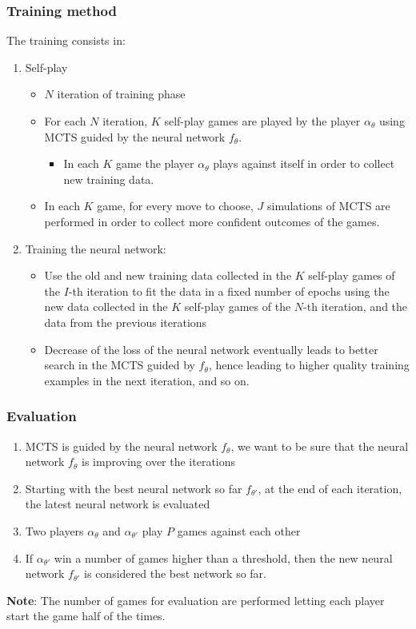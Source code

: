 \documentclass[9pt]{beamer}
\begin{document}
\begin{frame}
	\frametitle{Training method}

	The training consists in:
	\begin{enumerate}
		\item Self-play
		\begin{itemize}
			\item $N$ iteration of training phase
			\item For each $N$ iteration, $K$ self-play games are played by the player $\alpha_\theta$ using MCTS guided by the neural network $f_\theta$.
			\begin{itemize}
				\item In each $K$ game the player $\alpha_\theta$ plays against itself in order to collect new training data.
			\end{itemize}
			\item In each $K$ game, for every move to choose, $J$ simulations of MCTS are performed in order to collect more confident outcomes of the games.
		\end{itemize}
		
		\item Training the neural network:
		\begin{itemize}
			\item Use the old and new training data collected in the $K$ self-play games of the $I$-th iteration to fit the data in a fixed number of epochs using the new data collected in the $K$ self-play games of the $N$-th iteration, and the data from the previous iterations
			\item Decrease of the loss of the neural network eventually leads to better search in the MCTS guided by $f_\theta$, hence leading to higher quality training examples in the next iteration, and so on.
		\end{itemize}		
	\end{enumerate}

\end{frame}

\begin{frame}
	\frametitle{Evaluation}

	\begin{enumerate}
		\item MCTS is guided by the neural network $f_\theta$, we want to be sure that the neural network $f_\theta$ is improving over the iterations
		\item Starting with the best neural network so far $f_{\theta'}$, at the end of each iteration, the latest neural network is evaluated
		\item Two players $\alpha_\theta$ and $\alpha_{\theta'}$ play $P$ games against each other
		\item If $\alpha_{\theta'}$ win a number of games higher than a threshold, then the new neural network $f_{\theta'}$ is considered the best network so far.
	\end{enumerate}

	\textbf{Note}: The number of games for evaluation are performed letting each player start the game half of the times.


\end{frame}
\end{document}
